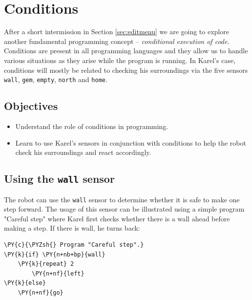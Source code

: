 
\section{Conditions} \label{sec:cond}

After a short intermission in Section \ref{sec:editmenu} we are going to explore
another fundamental programming concept -- {\em conditional execution of code}. Conditions 
are present in all programming languages and they allow us to 
handle various situations as they arise while the program is running. In Karel's case, 
conditions will mostly be related to checking his surroundings via the five sensors
{\tt wall}, {\tt gem}, {\tt empty}, {\tt north} and {\tt home}.

\subsection{Objectives} 

\begin{itemize}
\item Understand the role of conditions in programming.
\item Learn to use Karel's sensors in conjunction with conditions to help the robot
      check his surroundings and react accordingly. 
\end{itemize}

\subsection{Using the {\tt wall} sensor}

The robot can use the {\tt wall} sensor to determine 
whether it is safe to make one step forward.
The usage of this sensor can be illustrated 
using a simple program "Careful step" 
where Karel first checks whether there is a wall ahead before
making a step. If there is wall, he turns back:\\

\begin{bbox}
\begin{Verbatim}[commandchars=\\\{\}]
\PY{c}{\PYZsh{} Program "Careful step".}
\PY{k}{if} \PY{n+nb+bp}{wall}
    \PY{k}{repeat} 2
        \PY{n+nf}{left}
\PY{k}{else}
    \PY{n+nf}{go}
\end{Verbatim}
\end{bbox}
\vspace{6mm}


